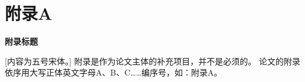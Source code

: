 
 \setlength{\baselineskip}{16pt}
\chapter{附录A}

\begin{center}
\textbf{附录标题}
\end{center}



\indent
{}
[内容为五号宋体。] 附录是作为论文主体的补充项目，并不是必须的。
论文的附录依序用大写正体英文字母A、B、C……编序号，如：附录A。